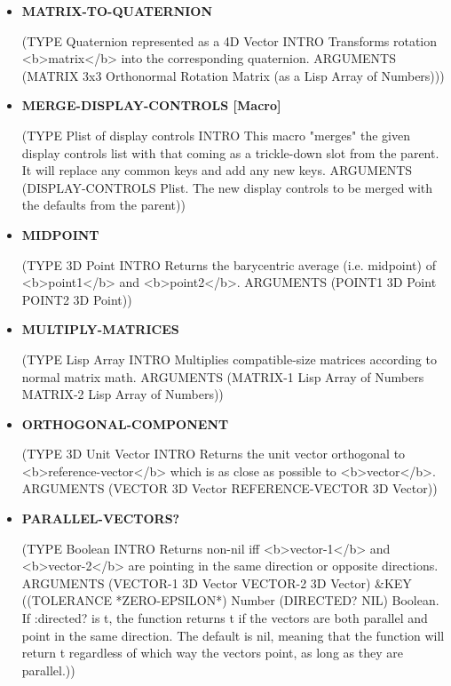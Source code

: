 \documentclass [11pt]{book}
\begin{document}
\begin{itemize}
\item {}
\label{prim:matrix-to-quaternion}
\textbf{MATRIX-TO-QUATERNION}

(TYPE Quaternion represented as a 4D Vector INTRO  Transforms rotation <b>matrix</b> into the corresponding quaternion.
 ARGUMENTS (MATRIX 3x3 Orthonormal Rotation Matrix (as a Lisp Array of Numbers)))



\item {}
\label{prim:merge-display-controls}
\textbf{MERGE-DISPLAY-CONTROLS [Macro]}

(TYPE Plist of display controls INTRO  This macro "merges" the given display controls list with
that coming as a trickle-down slot from the parent. It will replace any common keys and
add any new keys.
 ARGUMENTS (DISPLAY-CONTROLS Plist. The new display controls to be merged with the defaults from the parent))



\item {}
\label{prim:midpoint}
\textbf{MIDPOINT}

(TYPE 3D Point INTRO  Returns the barycentric average (i.e. midpoint)
of <b>point1</b> and <b>point2</b>.
 ARGUMENTS (POINT1 3D Point POINT2 3D Point))



\item {}
\label{prim:multiply-matrices}
\textbf{MULTIPLY-MATRICES}

(TYPE Lisp Array INTRO  Multiplies compatible-size matrices according to normal matrix math.
 ARGUMENTS (MATRIX-1 Lisp Array of Numbers MATRIX-2 Lisp Array of Numbers))



\item {}
\label{prim:orthogonal-component}
\textbf{ORTHOGONAL-COMPONENT}

(TYPE 3D Unit Vector INTRO  Returns the unit vector orthogonal to <b>reference-vector</b> which
is as close as possible to <b>vector</b>.
 ARGUMENTS (VECTOR 3D Vector REFERENCE-VECTOR 3D Vector))



\item {}
\label{prim:parallel-vectors?}
\textbf{PARALLEL-VECTORS?}

(TYPE Boolean INTRO  Returns non-nil iff <b>vector-1</b> and <b>vector-2</b> are pointing in the
same direction or opposite directions.
 ARGUMENTS (VECTOR-1 3D Vector VECTOR-2 3D Vector) \&KEY ((TOLERANCE *ZERO-EPSILON*) Number (DIRECTED? NIL) Boolean.  If :directed? is t, the function returns t if the vectors are both parallel and point in the same direction.  The default is nil, meaning that the function will return t regardless of which way the vectors point, as long as they are parallel.))




\end{itemize}
\end{document}
